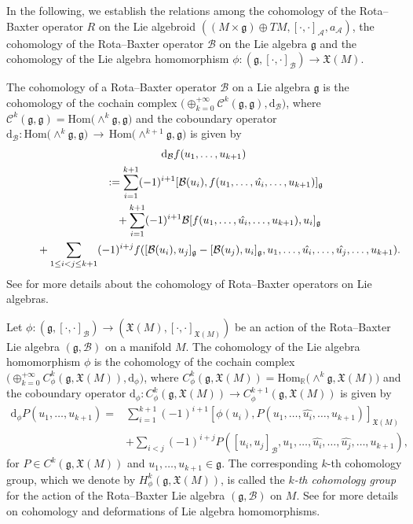 \documentclass[10pt,a4paper]{amsart}
\numberwithin{equation}{section}
\newcommand{\g}{\mathfrak g}
\newcommand{\Real}{\mathbb R}
\newcommand{\huaA}{\mathcal{A}}
\newcommand{\huaB}{\mathcal{B}}
\newcommand{\huaC}{\mathcal{C}}
\newcommand{\frkX}{\mathfrak X}
\newcommand{\lon }{\,\rightarrow\,}
\newcommand{\dM}{\mathrm{d}}
\newcommand{\Hom}{\mathrm{Hom}}
\begin{document}
In the following, we establish the relations among the cohomology of the Rota--Baxter operator $R$ on the Lie algebroid $((M \times\g)\oplus TM,[\cdot,\cdot]_{\huaA},a_{\huaA})$, the cohomology of the Rota--Baxter operator $\huaB$ on the Lie algebra $\g$ and the cohomology of the Lie algebra homomorphism $\phi\colon (\g, [\cdot,\cdot]_\huaB)\to\mathfrak{X}(M)$.

The cohomology of a Rota--Baxter operator $\huaB$ on a Lie algebra $\g$ is the cohomology of the cochain complex $\big({\oplus}_{k=0}^{+\infty}\huaC^k(\g,\g),\dM_\huaB\big)$, where $ \huaC^k(\g,\g)=\Hom\big({\wedge}^k\g,\g\big)$ and the coboundary operator $\dM_\huaB\colon \Hom\big({\wedge}^k\g,\g\big)\lon \Hom\big({\wedge}^{k+1}\g,\g\big)$ is given by
\begin{gather*}
 \dM_\huaB f(u_1,\dots,u_{k+1})
 \\ \qquad
{}:=\sum_{i=1}^{k+1}(-1)^{i+1}[\huaB(u_i),f(u_1,\dots,\hat{u_i},\dots, u_{k+1})]_\g
\\ \qquad\hphantom{=}
{}+\sum_{i=1}^{k+1}(-1)^{i+1}\huaB[f(u_1,\dots,\hat{u_i},\dots, u_{k+1}),u_i]_\g
\\ \qquad\hphantom{=}
{}+\sum_{1\le i<j\le k+1}(-1)^{i+j}f([\huaB(u_i),u_j]_\g-[\huaB(u_j),u_i]_\g,u_1,\dots,\hat{u_i},\dots,\hat{u_j},\dots, u_{k+1}).%
\end{gather*}
See \cite{TBGS} for more details about the cohomology of Rota--Baxter operators on Lie algebras.

Let $\phi \colon (\g, [\cdot,\cdot]_\huaB)\to(\mathfrak{X}(M),[\cdot,\cdot]_{\frkX(M)})$ be an action of the Rota--Baxter Lie algebra $(\g,\huaB)$ on a manifold $M$. The cohomology of the Lie algebra homomorphism $\phi $ is the cohomology of the cochain complex
$\big({\oplus}_{k=0}^{+\infty}C_\phi^k(\g,\mathfrak{X}(M)),\dM_\phi\big)$, where $C_\phi^k(\g,\mathfrak{X}(M))=\Hom_\Real\big({\wedge}^k \g, \mathfrak{X}(M)\big)$ and the coboundary operator $\dM_\phi\colon C_\phi^k(\g,\mathfrak{X}(M))\to C_\phi^{k+1}(\g,\mathfrak{X}(M))$ is given by
\begin{align*}
\dM_\phi P(u_1,\dots,u_{k+1})={}&\sum_{i=1}^{k+1}(-1)^{i+1} [\phi(u_i),P(u_1,\dots,\hat{u_i},\dots,u_{k+1})]_{\mathfrak{X}(M)}
\\
&+\sum_{i<j}(-1)^{i+j}P([u_i,u_j]_\huaB,u_1,\dots,\hat{u_i},\dots,\hat{u_j},\dots,u_{k+1}),
\end{align*}
for $P\in C^k(\g,\mathfrak{X}(M)) $ and $u_1,\dots,u_{k+1}\in \g$. The corresponding $k$-th cohomology group, which we denote by $H_{\phi}^k(\g,\mathfrak{X}(M))$, is called the {\it $k$-th cohomology group} for the action of the Rota--Baxter Lie algebra $(\g,\huaB)$ on $M$. See \cite{Fregier,NR2} for more details on cohomology and deformations of Lie algebra homomorphisms.
\end{document}
